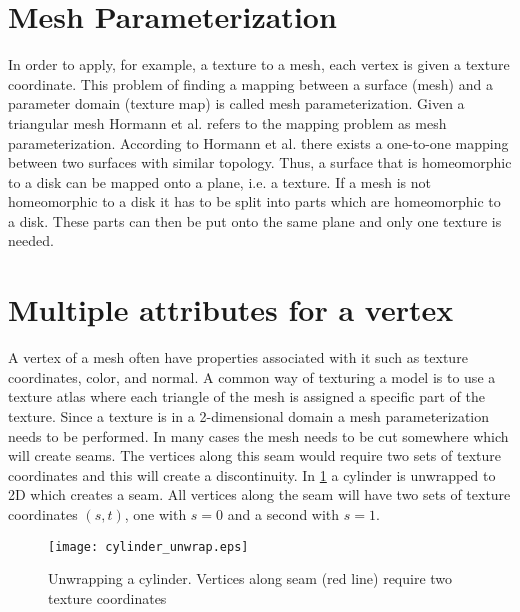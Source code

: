 \section{Mesh Parameterization} \label{sec:mesh_parametrization}
In order to apply, for example, a texture to a mesh, each vertex is given a texture coordinate. This problem of finding a mapping between a surface (mesh) and a parameter domain (texture map) is called mesh parameterization. Given a triangular mesh Hormann et al. \cite{hormann2007mesh} refers to the mapping problem as mesh parameterization. According to Hormann et al. there exists a one-to-one mapping between two surfaces with similar topology. Thus, a surface that is homeomorphic to a disk can be mapped onto a plane, i.e. a texture. If a mesh is not homeomorphic to a disk it has to be split into parts which are homeomorphic to a disk. These parts can then be put onto the same plane and only one texture is needed.

\section{Multiple attributes for a vertex} \label{sec:vertex_with_multi_attributes}
A vertex of a mesh often have properties associated with it such as texture coordinates, color, and normal. A common way of texturing a model is to use a texture atlas where each triangle of the mesh is assigned a specific part of the texture. Since a texture is in a 2-dimensional domain a mesh parameterization needs to be performed. In many cases the mesh needs to be cut somewhere which will create seams. The vertices along this seam would require two sets of texture coordinates and this will create a discontinuity. In \cref{fig:cylinder_unwrap} a cylinder is unwrapped to 2D which creates a seam. All vertices along the seam will have two sets of texture coordinates $(s,t)$, one with $s=0$ and a second with $s=1$.


\begin{figure}[ht]
    \centering
    \texttt{[image: cylinder\_unwrap.eps]}
    \caption[Unwrapping a cylinder]{Unwrapping a cylinder. Vertices along seam (red line) require two texture coordinates}
    \label{fig:cylinder_unwrap}
\end{figure}



